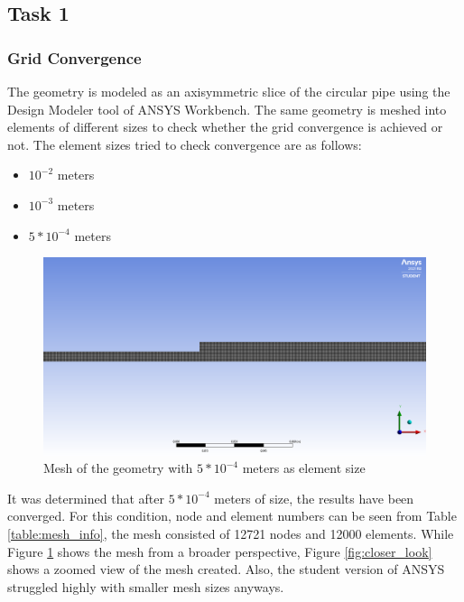 \subsection{Task 1}
\subsubsection{Grid Convergence}
\noindent The geometry is modeled as an axisymmetric slice of the circular pipe using the Design Modeler tool of ANSYS Workbench. The same geometry is meshed into elements of different sizes to check whether the grid convergence is achieved or not. The element sizes tried to check convergence are as follows:

\begin{itemize}
    \item $10^{-2}$ meters
    \item $10^{-3} $ meters
    \item $5* 10^{-4}$  meters
\end{itemize}

\begin{figure}[h]
    \centering
    \includegraphics[width=16cm]{images/task1/5e04mesh.png}
    \caption{Mesh of the geometry with $5*10^{-4}$ meters as element size}
    \label{fig:mesh_fig}
\end{figure}


\noindent It was determined that after $5*10^{-4}$ meters of size, the results have been converged. For this condition, node and element numbers can be seen from Table \ref{table:mesh_info}, the mesh consisted of 12721 nodes and 12000 elements. While Figure \ref{fig:mesh_fig} shows the mesh from a broader perspective, Figure \ref{fig:closer_look} shows a zoomed view of the mesh created. Also, the student version of ANSYS struggled highly with smaller mesh sizes anyways.

